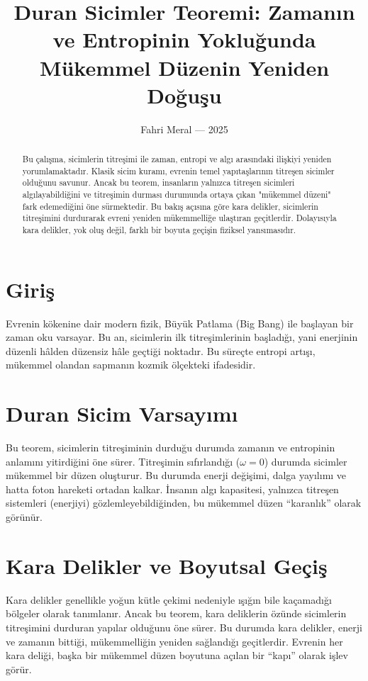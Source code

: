 \documentclass[12pt]{article}
\title{\textbf{Duran Sicimler Teoremi: Zamanın ve Entropinin Yokluğunda Mükemmel Düzenin Yeniden Doğuşu}}
\author{Fahri Meral — 2025}
\date{}
\begin{document}
\maketitle

\begin{abstract}
Bu çalışma, sicimlerin titreşimi ile zaman, entropi ve algı arasındaki ilişkiyi yeniden yorumlamaktadır. 
Klasik sicim kuramı, evrenin temel yapıtaşlarının titreşen sicimler olduğunu savunur. 
Ancak bu teorem, insanların yalnızca titreşen sicimleri algılayabildiğini ve titreşimin durması durumunda ortaya çıkan 
"mükemmel düzeni" fark edemediğini öne sürmektedir. 
Bu bakış açısına göre kara delikler, sicimlerin titreşimini durdurarak evreni yeniden mükemmelliğe ulaştıran geçitlerdir. 
Dolayısıyla kara delikler, yok oluş değil, farklı bir boyuta geçişin fiziksel yansımasıdır.
\end{abstract}

\section{Giriş}
Evrenin kökenine dair modern fizik, Büyük Patlama (Big Bang) ile başlayan bir zaman oku varsayar. 
Bu an, sicimlerin ilk titreşimlerinin başladığı, yani enerjinin düzenli hâlden düzensiz hâle geçtiği noktadır. 
Bu süreçte entropi artışı, mükemmel olandan sapmanın kozmik ölçekteki ifadesidir.

\section{Duran Sicim Varsayımı}
Bu teorem, sicimlerin titreşiminin durduğu durumda zamanın ve entropinin anlamını yitirdiğini öne sürer. 
Titreşimin sıfırlandığı (\(\omega = 0\)) durumda sicimler mükemmel bir düzen oluşturur. 
Bu durumda enerji değişimi, dalga yayılımı ve hatta foton hareketi ortadan kalkar. 
İnsanın algı kapasitesi, yalnızca titreşen sistemleri (enerjiyi) gözlemleyebildiğinden, bu mükemmel düzen “karanlık” olarak görünür.

\section{Kara Delikler ve Boyutsal Geçiş}
Kara delikler genellikle yoğun kütle çekimi nedeniyle ışığın bile kaçamadığı bölgeler olarak tanımlanır. 
Ancak bu teorem, kara deliklerin özünde sicimlerin titreşimini durduran yapılar olduğunu öne sürer. 
Bu durumda kara delikler, enerji ve zamanın bittiği, mükemmelliğin yeniden sağlandığı geçitlerdir. 
Evrenin her kara deliği, başka bir mükemmel düzen boyutuna açılan bir “kapı” olarak işlev görür.
\end{document}
